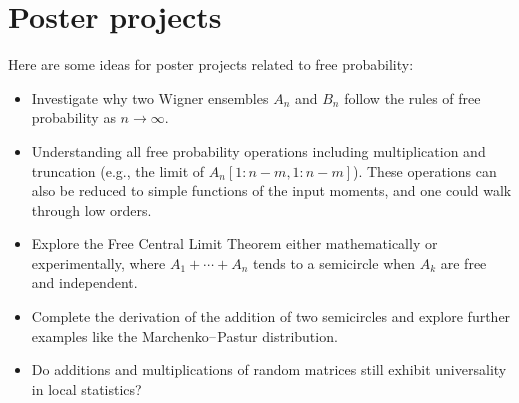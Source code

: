 \section{Poster projects}
Here are some ideas for poster projects related to free probability:

\begin{itemize}
\item[1. ] Investigate why two Wigner ensembles $A_n$ and $B_n$ follow the rules of free probability as $n \ensuremath{\rightarrow} \ensuremath{\infty}$.


\item[2. ] Understanding all free probability operations including multiplication and truncation (e.g., the limit of $A_n[1:n-m,1:n-m]$). These operations can also be reduced to simple functions of the input moments, and one could walk through low orders.


\item[3. ] Explore the Free Central Limit Theorem either mathematically or experimentally,  where $A_1 + \ensuremath{\cdots} + A_n$ tends to a semicircle when $A_k$ are free and independent.


\item[4. ] Complete the derivation of the addition of two semicircles and explore further examples like the Marchenko\ensuremath{\endash}Pastur distribution.


\item[5. ] Do additions and multiplications of random matrices still exhibit universality in local statistics?

\end{itemize}

